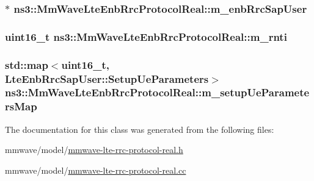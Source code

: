 \subsubsection[{\texorpdfstring{m\+\_\+enb\+Rrc\+Sap\+User}{m_enbRrcSapUser}}]{$\ast$ ns3\+::\+Mm\+Wave\+Lte\+Enb\+Rrc\+Protocol\+Real\+::m\+\_\+enb\+Rrc\+Sap\+User\hspace{0.3cm}{\ttfamily [private]}}\hypertarget{classns3_1_1MmWaveLteEnbRrcProtocolReal_a46eee634a1a7c1e649fccb018116376d}{}\label{classns3_1_1MmWaveLteEnbRrcProtocolReal_a46eee634a1a7c1e649fccb018116376d}
\subsubsection[{\texorpdfstring{m\+\_\+rnti}{m_rnti}}]{\setlength{\rightskip}{0pt plus 5cm}uint16\+\_\+t ns3\+::\+Mm\+Wave\+Lte\+Enb\+Rrc\+Protocol\+Real\+::m\+\_\+rnti\hspace{0.3cm}{\ttfamily [private]}}\hypertarget{classns3_1_1MmWaveLteEnbRrcProtocolReal_af8ae29bed8df369bc9bdbd537ba36d8d}{}\label{classns3_1_1MmWaveLteEnbRrcProtocolReal_af8ae29bed8df369bc9bdbd537ba36d8d}
\subsubsection[{\texorpdfstring{m\+\_\+setup\+Ue\+Parameters\+Map}{m_setupUeParametersMap}}]{\setlength{\rightskip}{0pt plus 5cm}std\+::map$<$uint16\+\_\+t, {\bf Lte\+Enb\+Rrc\+Sap\+User\+::\+Setup\+Ue\+Parameters}$>$ ns3\+::\+Mm\+Wave\+Lte\+Enb\+Rrc\+Protocol\+Real\+::m\+\_\+setup\+Ue\+Parameters\+Map\hspace{0.3cm}{\ttfamily [private]}}\hypertarget{classns3_1_1MmWaveLteEnbRrcProtocolReal_a3df42581baab5d1a95e3a7f280d0e831}{}\label{classns3_1_1MmWaveLteEnbRrcProtocolReal_a3df42581baab5d1a95e3a7f280d0e831}


The documentation for this class was generated from the following files\+:\begin{DoxyCompactItemize}
\item 
mmwave/model/\hyperlink{mmwave-lte-rrc-protocol-real_8h}{mmwave-\/lte-\/rrc-\/protocol-\/real.\+h}\item 
mmwave/model/\hyperlink{mmwave-lte-rrc-protocol-real_8cc}{mmwave-\/lte-\/rrc-\/protocol-\/real.\+cc}\end{DoxyCompactItemize}
